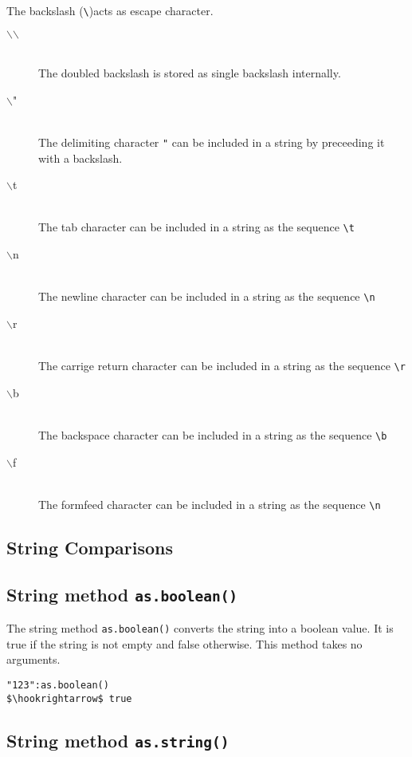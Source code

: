 \documentclass[11pt,a4paper]{scrbook}
\newcommand\BS{\(\backslash\)}
\begin{document}
The backslash (\verb|\|)acts as escape character.
\begin{description}
\item [\BS\BS] \ \\The doubled backslash is stored as single backslash
  internally.
\item [\BS "] \ \\The delimiting character \verb|"| can be included in a
  string by preceeding it with a backslash.
\item [\BS t] \ \\The tab character can be included in a string as the
  sequence \verb|\t|
\item [\BS n] \ \\The newline character can be included in a string as the
  sequence \verb|\n|
\item [\BS r] \ \\The carrige return character can be included in a string as
  the sequence \verb|\r|
\item [\BS b] \ \\The backspace character can be included in a string as the
  sequence \verb|\b|
\item [\BS f] \ \\The formfeed character can be included in a string as the
  sequence \verb|\n|
\end{description}

\subsection{String Comparisons}



\subsection{String method \texttt{as.boolean()}}

The string method \texttt{as.boolean()} converts the string into a boolean
value. It is true if the string is not empty and false otherwise. This method
takes no arguments.

\begin{lstlisting}[language=BibTool,mathescape=true]
"123":as.boolean()
$\hookrightarrow$ true
\end{lstlisting}

\subsection{String method \texttt{as.string()}}
\end{document}
